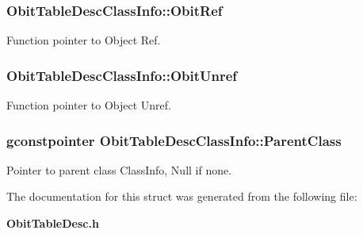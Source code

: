 \subsubsection{ {\bf Obit\-Table\-Desc\-Class\-Info::Obit\-Ref}}\label{structObitTableDescClassInfo_o10}


Function pointer to Object Ref. 

\subsubsection{ {\bf Obit\-Table\-Desc\-Class\-Info::Obit\-Unref}}\label{structObitTableDescClassInfo_o11}


Function pointer to Object Unref. 

\subsubsection{\setlength{\rightskip}{0pt plus 5cm}gconstpointer {\bf Obit\-Table\-Desc\-Class\-Info::Parent\-Class}}\label{structObitTableDescClassInfo_o3}


Pointer to parent class Class\-Info, Null if none. 



The documentation for this struct was generated from the following file:\begin{CompactItemize}
\item 
{\bf Obit\-Table\-Desc.h}\end{CompactItemize}
